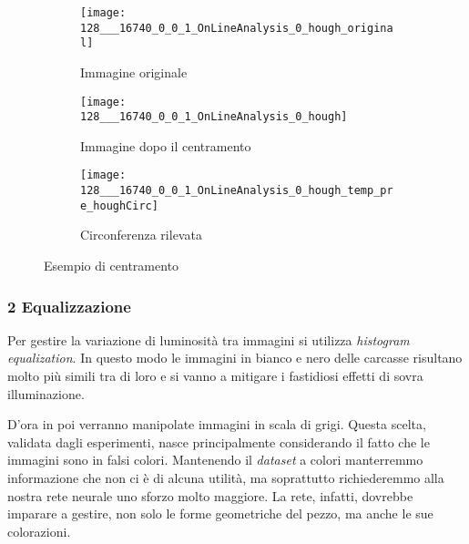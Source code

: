\begin{figure}[ht] %
  \begin{center}
    \begin{subfigure}{.49\linewidth}
      \centering\texttt{[image: 128\_\_\_16740\_0\_0\_1\_OnLineAnalysis\_0\_hough\_original]}
      \caption{Immagine originale}
      \label{fig:p1_originale}
    \end{subfigure}
    \begin{subfigure}{.49\linewidth}
      \centering\texttt{[image: 128\_\_\_16740\_0\_0\_1\_OnLineAnalysis\_0\_hough]}
      \caption{Immagine dopo il centramento}
      \label{fig:p1_centrata}
    \end{subfigure}
    \begin{subfigure}{.49\linewidth}
      \centering\texttt{[image: 128\_\_\_16740\_0\_0\_1\_OnLineAnalysis\_0\_hough\_temp\_pre\_houghCirc]}
      \caption{Circonferenza rilevata}
      \label{fig:p1_circ}
    \end{subfigure}
  \end{center}
  \caption{Esempio di centramento}
  \label{fig:centramento}
\end{figure}

\subsubsection{2 Equalizzazione}
Per gestire la variazione di luminosità tra immagini si utilizza \textit{histogram equalization}.
In questo modo le immagini in bianco e nero delle carcasse risultano molto più simili tra di loro e si vanno a mitigare i fastidiosi effetti di sovra illuminazione.

D'ora in poi verranno manipolate immagini in scala di grigi.
Questa scelta, validata dagli esperimenti, nasce principalmente considerando il fatto che le immagini sono in falsi colori.
Mantenendo il \textit{dataset} a colori manterremmo informazione che non ci è di alcuna utilità, ma soprattutto richiederemmo alla nostra rete neurale uno sforzo molto maggiore.
La rete, infatti, dovrebbe imparare a gestire, non solo le forme geometriche del pezzo, ma anche le sue colorazioni.

